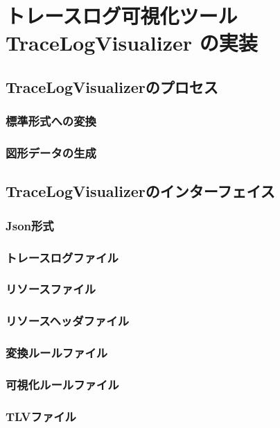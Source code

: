 \chapter{トレースログ可視化ツール TraceLogVisualizer の実装}

\section{TraceLogVisualizerのプロセス}

\subsection{標準形式への変換}

\subsection{図形データの生成}

\section{TraceLogVisualizerのインターフェイス}

\subsection{Json形式}

\subsection{トレースログファイル}

\subsection{リソースファイル}

\subsection{リソースヘッダファイル}

\subsection{変換ルールファイル}

\subsection{可視化ルールファイル}

\subsection{TLVファイル}
